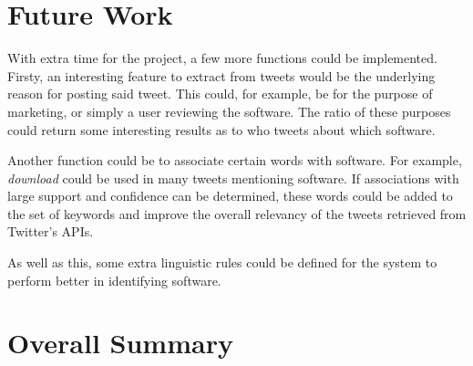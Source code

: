 \section{Future Work}
With extra time for the project, a few more functions could be implemented. Firsty, an interesting feature to extract from tweets would be the underlying reason for posting said tweet. This could, for example, be for the purpose of marketing, or simply a user reviewing the software. The ratio of these purposes could return some interesting results as to who tweets about which software. 

Another function could be to associate certain words with software. For example, \emph{download} could be used in many tweets mentioning software. If associations with large support and confidence can be determined, these words could be added to the set of keywords and improve the overall relevancy of the tweets retrieved from Twitter's APIs.

As well as this, some extra linguistic rules could be defined for the system to perform better in identifying software.

\section{Overall Summary}

